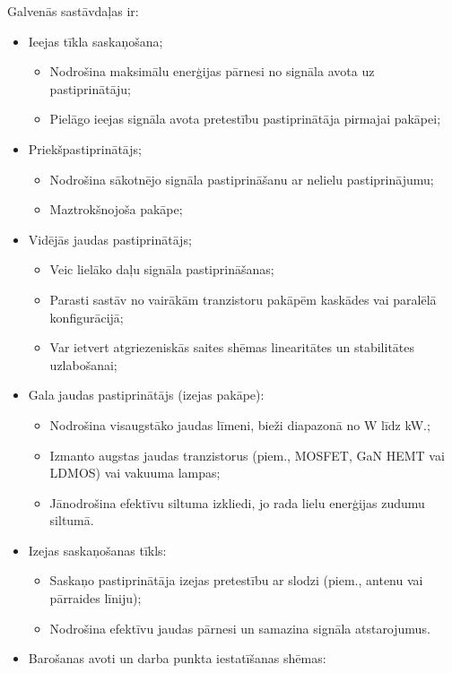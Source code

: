 Galvenās sastāvdaļas ir:
\begin{itemize}
    \item Ieejas tīkla saskaņošana;
    \begin{itemize}
        \item Nodrošina maksimālu enerģijas pārnesi no signāla avota uz pastiprinātāju;
        \item Pielāgo ieejas signāla avota pretestību pastiprinātāja pirmajai pakāpei;
    \end{itemize}
    \item Priekšpastiprinātājs;
    \begin{itemize}
        \item Nodrošina sākotnējo signāla pastiprināšanu ar nelielu pastiprinājumu;
        \item Maztrokšnojoša pakāpe;
    \end{itemize}
    \item Vidējās jaudas pastiprinātājs;
    \begin{itemize}
        \item Veic lielāko daļu signāla pastiprināšanas;
        \item Parasti sastāv no vairākām tranzistoru pakāpēm kaskādes vai paralēlā konfigurācijā;
        \item Var ietvert atgriezeniskās saites shēmas linearitātes un stabilitātes uzlabošanai; 
    \end{itemize}
    \item Gala jaudas pastiprinātājs (izejas pakāpe):
    \begin{itemize}
        \item Nodrošina visaugstāko jaudas līmeni, bieži diapazonā no W līdz kW.;
        \item Izmanto augstas jaudas tranzistorus (piem., MOSFET, GaN HEMT vai LDMOS) vai vakuuma lampas;
        \item Jānodrošina efektīvu siltuma izkliedi, jo rada lielu enerģijas zudumu siltumā.
    \end{itemize}
    \item Izejas saskaņošanas tīkls:
    \begin{itemize}
        \item Saskaņo pastiprinātāja izejas pretestību ar slodzi (piem., antenu vai pārraides līniju);
        \item Nodrošina efektīvu jaudas pārnesi un samazina signāla atstarojumus.
    \end{itemize}
    \item Barošanas avoti un darba punkta iestatīšanas shēmas:

\end{itemize}
